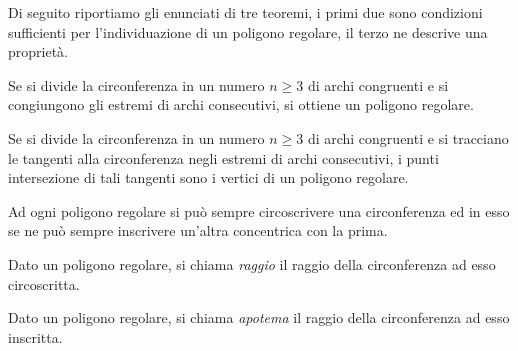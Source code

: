 Di seguito riportiamo gli enunciati di tre teoremi, i primi due sono condizioni 
sufficienti per l'individuazione di un poligono regolare, il terzo ne descrive 
una proprietà.

\begin{teorema}
Se si divide la circonferenza in un numero \(n\geq 3\) di archi 
congruenti e si congiungono gli estremi di archi consecutivi, si 
ottiene un poligono regolare.
\end{teorema}


\begin{inaccessibleblock}
 \begin{figure}[!htb]
  \centering
\end{figure}
\end{inaccessibleblock}

\begin{teorema}
Se si divide la circonferenza in un numero \(n\geq 3\) di archi 
congruenti e si tracciano le tangenti alla circonferenza negli  
estremi di archi consecutivi, i punti intersezione di tali tangenti 
sono i vertici di un poligono regolare.
\end{teorema}


\begin{inaccessibleblock}
 \begin{figure}[!htb]
  \centering
\end{figure}
\end{inaccessibleblock}


\begin{teorema}\label{teo:poly_reg_circ_inscr_circos}
Ad ogni poligono regolare si può sempre circoscrivere una 
circonferenza ed in esso se ne può sempre inscrivere un'altra 
concentrica con la prima.
\end{teorema}


\begin{inaccessibleblock}
 \begin{figure}[!htb]
  \centering
\end{figure}
\end{inaccessibleblock}


\begin{definizione}
Dato un poligono regolare, si chiama \emph{raggio} il raggio della 
circonferenza ad esso circoscritta.
\end{definizione}

\begin{definizione}
Dato un poligono regolare, si chiama \emph{apotema} il raggio della 
circonferenza ad esso inscritta.
\end{definizione}


% 
% 
% 
% 
